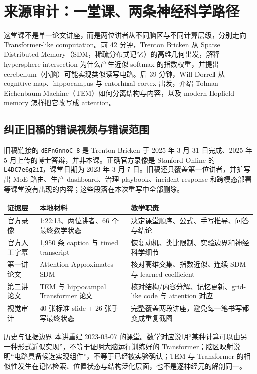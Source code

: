 \section{来源审计：一堂课、两条神经科学路径}

这堂课不是单一论文讲座，而是两位讲者从不同脑区与不同计算层级，分别走向 Transformer-like computation。前 42 分钟，Trenton Bricken 从 Sparse Distributed Memory（SDM，稀疏分布式记忆）的高维几何出发，解释 hypersphere intersection 为什么产生近似 softmax 的指数权重，并提出 cerebellum（小脑）可能实现类似读写电路。后 39 分钟，Will Dorrell 从 cognitive map、hippocampus 与 entorhinal cortex 出发，介绍 Tolman--Eichenbaum Machine（TEM）如何分离结构与内容，以及 modern Hopfield memory 怎样把它改写成 attention。

\subsection{纠正旧稿的错误视频与错误范围}

旧稿链接的 \texttt{dEFn6nnoC-8} 是 Trenton Bricken 于 2025 年 3 月 31 日完成、2025 年 5 月上传的博士答辩，并非本课。正确官方录像是 Stanford Online 的 \texttt{L4DC7e6g2iI}，课堂日期为 2023 年 3 月 7 日。旧稿还只覆盖第一位讲者，并扩写出 MoE 路由、生产 dashboard、治理 playbook、incident response 和跨模态部署等课堂没有出现的内容；这些段落在本次重写中全部删除。

\begin{longtable}{@{}L{0.18\textwidth}L{0.29\textwidth}L{0.41\textwidth}@{}}
\toprule
证据层 & 本地材料 & 教学职责 \\
\midrule
官方录像 & 1:22:13、两位讲者、66 个最终教学状态 & 决定课堂顺序、公式、手写推导、问答与结论 \\
官方人工字幕 & 1,950 条 caption 与 timed transcript & 恢复动机、类比限制、实验边界和神经科学细节 \\
第一讲论文 & Attention Approximates SDM & 核对高维交集、指数近似、连续 SDM 与 learned coefficient \\
第二讲论文 & TEM 与 hippocampal Transformer 论文 & 核对结构/内容分解、记忆更新、grid-like code 与 attention 对应 \\
视觉审计 & 40 张标准 slide + 26 张手写最终状态 & 完整覆盖两段讲座，避免每一笔书写都变成重复截图 \\
\bottomrule
\end{longtable}

\begin{warningbox}{历史与证据边界}
本讲重建 2023-03-07 的课堂。数学对应说明“某种计算可以由另一种形式近似实现”，不等于证明大脑运行训练好的 Transformer；脑区映射说明“电路具备候选实现组件”，不等于已经被实验确认；TEM 与 Transformer 的相似性发生在记忆检索、位置状态与结构泛化层面，也不是逐神经元的解剖同一。
\end{warningbox}

